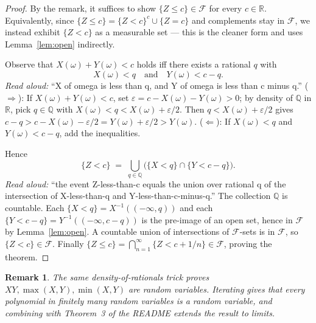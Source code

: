 \documentclass[11pt]{article}
\newtheorem{remark}[theorem]{Remark}
\begin{document}
\begin{proof}
By the remark, it suffices to show $\{Z \le c\} \in \mathcal{F}$ for every $c \in \mathbb{R}$.
Equivalently, since $\{Z \le c\} = \{Z < c\}^c \cup \{Z = c\}$ and complements stay in
$\mathcal{F}$, we instead exhibit $\{Z < c\}$ as a measurable set --- this is the cleaner form
and uses Lemma~\ref{lem:open} indirectly.

Observe that $X(\omega) + Y(\omega) < c$ holds iff there exists a rational $q$ with
\[
   X(\omega) < q \quad \text{and} \quad Y(\omega) < c - q.
\]
\emph{Read aloud:} ``X of omega is less than q, and Y of omega is less than c minus q.''
($\Rightarrow$): If $X(\omega) + Y(\omega) < c$, set $\varepsilon = c - X(\omega) - Y(\omega) > 0$;
by density of $\mathbb{Q}$ in $\mathbb{R}$, pick $q \in \mathbb{Q}$ with
$X(\omega) < q < X(\omega) + \varepsilon/2$. Then $q < X(\omega) + \varepsilon/2$ gives
$c - q > c - X(\omega) - \varepsilon/2 = Y(\omega) + \varepsilon/2 > Y(\omega)$.
($\Leftarrow$): If $X(\omega) < q$ and $Y(\omega) < c - q$, add the inequalities.

Hence
\[
   \{Z < c\} \;=\; \bigcup_{q \in \mathbb{Q}} \Big( \{X < q\} \cap \{Y < c - q\} \Big).
\]
\emph{Read aloud:} ``the event Z-less-than-c equals the union over rational q of the intersection of X-less-than-q and Y-less-than-c-minus-q.''
The collection $\mathbb{Q}$ is countable. Each $\{X < q\} = X^{-1}((-\infty, q))$ and each
$\{Y < c-q\} = Y^{-1}((-\infty, c-q))$ is the pre-image of an open set, hence in $\mathcal{F}$
by Lemma~\ref{lem:open}. A countable union of intersections of $\mathcal{F}$-sets is in
$\mathcal{F}$, so $\{Z < c\} \in \mathcal{F}$. Finally
$\{Z \le c\} = \bigcap_{n=1}^\infty \{Z < c + 1/n\} \in \mathcal{F}$, proving the theorem.
\end{proof}

\begin{remark}
The same density-of-rationals trick proves $XY, \max(X,Y), \min(X,Y)$ are random variables.
Iterating gives that every polynomial in finitely many random variables is a random variable,
and combining with Theorem~3 of the README extends the result to limits.
\end{remark}
\end{document}
